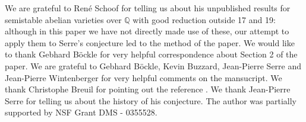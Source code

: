 \documentclass[12pt]{amsart}
\newcommand{\Q}{\mathbb{Q}}
\begin{document}


\vspace{5mm}

 We are grateful to Ren\'e Schoof for 
telling us about his unpublished results 
for semistable abelian varieties over $\Q$ with good reduction outside 17 and 19: although in this paper we have 
not directly made use of these, our attempt to apply them to Serre's conjecture led to the method of the paper.
We would like to thank Gebhard B\"ockle for very helpful correspondence about Section 2 of the paper. 
We are grateful to Gebhard B\"ockle, Kevin Buzzard, Jean-Pierre Serre and Jean-Pierre Wintenberger for very helpful comments on the mansucript. We thank Christophe Breuil for pointing out the reference \cite{Savitt1}. We thank Jean-Pierre Serre for telling us about the history of his conjecture.  The author was partially supported
by NSF Grant DMS - 0355528.
\end{document}
